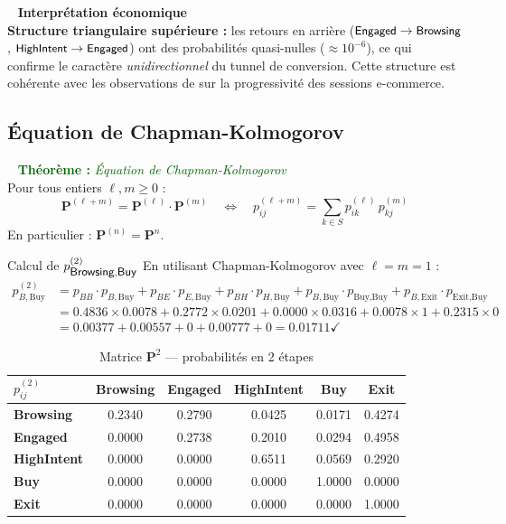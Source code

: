 \documentclass[11pt,a4paper]{article}
\newenvironment{thmbox}[1]{%
  \vspace{3pt}\begin{framed}
  \noindent{\color{DarkGreen}\rule{0.3cm}{3pt}}~%
  \textcolor{DarkGreen}{\textbf{Théorème :} \textit{#1}}\\[3pt]}
  {\end{framed}\vspace{3pt}}
\newenvironment{insightbox}{%
  \vspace{3pt}\begin{framed}
  \noindent{\color{NavyBlue}\rule{0.3cm}{3pt}}~%
  \textcolor{NavyBlue}{\textbf{Interprétation économique}}\\[3pt]}
  {\end{framed}\vspace{3pt}}
\newcommand{\mat}[1]{\mathbf{#1}}
\newcommand{\st}[1]{\textsf{\small#1}}
\begin{document}
\begin{insightbox}
\textbf{Structure triangulaire supérieure :} les retours en arrière
($\st{Engaged} \to \st{Browsing}$, $\st{HighIntent} \to \st{Engaged}$)
ont des probabilités quasi-nulles ($\approx 10^{-6}$), ce qui confirme
le caractère \emph{unidirectionnel} du tunnel de conversion.
Cette structure est cohérente avec les observations de \citet{quadrana2017}
sur la progressivité des sessions e-commerce.
\end{insightbox}

\subsection{Équation de Chapman-Kolmogorov}

\begin{thmbox}{Équation de Chapman-Kolmogorov}
Pour tous entiers $\ell, m \geq 0$ :
\[
  \mat{P}^{(\ell+m)} = \mat{P}^{(\ell)} \cdot \mat{P}^{(m)}
  \quad\Longleftrightarrow\quad
  p_{ij}^{(\ell+m)} = \sum_{k\in S} p_{ik}^{(\ell)}\,p_{kj}^{(m)}
\]
En particulier : $\mat{P}^{(n)} = \mat{P}^n$.
\end{thmbox}

\begin{exbox}{Calcul de $p^{(2)}_{\st{Browsing},\st{Buy}}$}
En utilisant Chapman-Kolmogorov avec $\ell=m=1$ :
\begin{align*}
  p_{B,\text{Buy}}^{(2)}
  &= p_{BB}\cdot p_{B,\text{Buy}} + p_{BE}\cdot p_{E,\text{Buy}}
   + p_{BH}\cdot p_{H,\text{Buy}}
   + p_{B,\text{Buy}}\cdot p_{\text{Buy,Buy}}
   + p_{B,\text{Exit}}\cdot p_{\text{Exit,Buy}} \\
  &= 0.4836\times 0.0078 + 0.2772\times 0.0201
   + 0.0000\times 0.0316 + 0.0078\times 1
   + 0.2315\times 0 \\
  &= 0.00377 + 0.00557 + 0 + 0.00777 + 0
   = \mathbf{0.01711} \checkmark
\end{align*}
\end{exbox}

\begin{table}[H]
\centering
\caption{Matrice $\mat{P}^2$ --- probabilités en 2 étapes}
\label{tab:P2}
\begin{tabular}{l|ccccc}
\toprule
\rowcolor{DarkBlue}
\color{white}$p_{ij}^{(2)}$ &
\color{white}Browsing & \color{white}Engaged &
\color{white}HighIntent & \color{white}Buy & \color{white}Exit \\
\midrule
\textbf{Browsing}   & 0.2340 & 0.2790 & 0.0425 & 0.0171 & 0.4274 \\
\rowcolor{LightGray}
\textbf{Engaged}    & 0.0000 & 0.2738 & 0.2010 & 0.0294 & 0.4958 \\
\textbf{HighIntent} & 0.0000 & 0.0000 & 0.6511 & 0.0569 & 0.2920 \\
\rowcolor{LightGray}
\textbf{Buy}        & 0.0000 & 0.0000 & 0.0000 & 1.0000 & 0.0000 \\
\textbf{Exit}       & 0.0000 & 0.0000 & 0.0000 & 0.0000 & 1.0000 \\
\bottomrule
\end{tabular}
\end{table}
\end{document}

